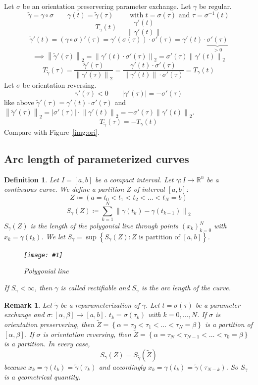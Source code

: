 \documentclass{article}
\newtheorem{definition}{Definition}  \numberwithin{definition}{section}
\newtheorem{remark}{Remark}  \numberwithin{remark}{section}
\newcommand{\pic}[2]{%
 \begin{figure}[t]
  \begin{center}
   \texttt{[image: \#1]}
   \caption{#2}
  \end{center}
 \end{figure}
}
\newcommand{\set}[1]{\left\{#1\right\}}
\newcommand{\norm}[1]{\left\|#1\right\|}
\newcommand{\card}[1]{\left|#1\right|}
\begin{document}
Let $\sigma$ be an orientation preservering parameter exchange. Let $\gamma$ be regular.
\[
  \tilde\gamma = \gamma \circ \sigma \qquad \gamma(t) = \tilde\gamma(\tau)
  \qquad \text{ with } t = \sigma(\tau) \text{ and } \tau = \sigma^{-1}(t)
\]
\[ T_{\gamma}(t) = \frac{\gamma'(t)}{\norm{\gamma'(t)}} \]
\[ \tilde\gamma'(t) = (\gamma \circ \sigma)'(\tau) = \gamma'(\sigma(\tau)) \cdot \sigma'(\tau) = \gamma'(t) \cdot \underbrace{\sigma'(\tau)}_{> 0} \]
\[ \implies \norm{\tilde\gamma'(\tau)}_2 = \norm{\gamma'(t) \cdot \sigma'(\tau)}_2 = \sigma'(\tau) \norm{\gamma'(t)}_2 \]
\[ T_{\tilde\gamma}(\tau) = \frac{\tilde\gamma'(\tau)}{\norm{\gamma'(\tau)}_2} = \frac{\gamma'(t) \cdot \sigma'(\tau)}{\norm{\gamma'(t)} \cdot \sigma'(\tau)} = T_{\gamma}(t) \]
Let $\sigma$ be orientation reversing.
\[ \gamma'(\tau) < 0 \qquad \card{\gamma'(\tau)} = -\sigma'(\tau) \]
like above $\tilde\gamma'(\tau) = \gamma'(t) \cdot \sigma'(\tau)$ and $\norm{\tilde\gamma'(\tau)}_2 = \card{\sigma'(\tau)} \cdot \norm{\gamma'(t)}_2 = -\sigma'(\tau) \norm{\gamma'(t)}_2$.
\[ T_{\tilde\gamma}(\tau) = -T_{\gamma}(t) \]
Compare with Figure~\ref{img:ori}.

\subsection{Arc length of parameterized curves}
\begin{definition} %
  Let $I = [a,b]$ be a compact interval. Let $\gamma: I \to \mathbb R^n$ be a continuous curve.
  We define a partition $Z$ of interval $[a,b]$:
  \[ Z \coloneqq (a = t_0 < t_1 < t_2 < \dots < t_N = b) \]
  \[ S_\gamma(Z) \coloneqq \sum_{k=1}^N \norm{\gamma(t_k) - \gamma(t_{k-1})}_2 \]
  $S_\gamma(Z)$ is the length of the polygonial line through points $(x_k)_{k=0}^N$ with $x_k = \gamma(t_k)$.
  We let $S_\gamma = \sup\set{S_\gamma(Z): Z \text{ is partition of } [a,b]}$.

  \pic{img/46_polygonial_line.pdf}{Polygonial line}

  If $S_{\gamma} < \infty$, then $\gamma$ is called \emph{rectifiable}
  and $S_{\gamma}$ is the \emph{arc length of the curve}.
\end{definition}

\begin{remark}
  Let $\tilde\gamma$ be a reparameterization of $\gamma$.
  Let $t = \sigma(\tau)$ be a parameter exchange and $\sigma: [\alpha, \beta] \to [a,b]$.
  $t_k = \sigma(\tau_k)$ with $k = 0, \dots, N$.
  If $\sigma$ is orientation preservering, then $\tilde Z = \set{\alpha = \tau_0 < \tau_1 < \dots < \tau_N = \beta}$ is a partition of $[\alpha, \beta]$.
  If $\sigma$ is orientation reversing, then $\tilde Z = \set{\alpha = \tau_N < \tau_{N-1} < \dots < \tau_0 = \beta}$ is a partition.
  In every case,
  \[ S_{\gamma}(Z) = S_{\tilde\gamma}(\tilde Z) \]
  because $x_k = \gamma(t_k) = \tilde\gamma(\tau_k)$ and accordingly $x_k = \gamma(t_k) = \tilde\gamma(\tau_{N-k})$.
  So $S_\gamma$ is a geometrical quantity.
\end{remark}
\end{document}
